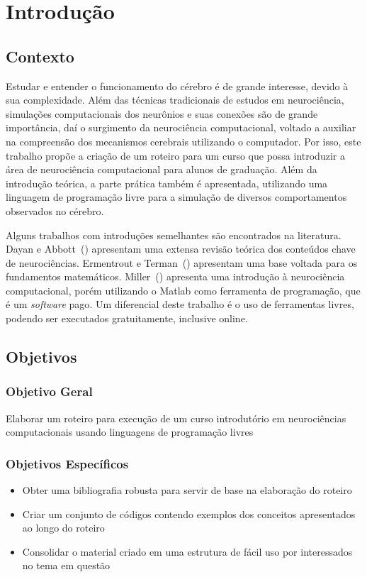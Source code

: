 \chapter{Introdução}\label{cap:introducao}
\section{Contexto}
Estudar e entender o funcionamento do cérebro é de grande interesse, devido à sua complexidade. Além das técnicas tradicionais de estudos em neurociência, simulações computacionais dos neurônios e suas conexões são de grande importância, daí o surgimento da neurociência computacional, voltado a auxiliar na compreensão dos mecanismos cerebrais utilizando o computador. Por isso, este trabalho propõe a criação de um roteiro para um curso que possa introduzir a área de neurociência computacional para alunos de graduação. Além da introdução teórica, a parte prática também é apresentada, utilizando uma linguagem de programação livre para a simulação de diversos comportamentos observados no cérebro.

Alguns trabalhos com introduções semelhantes são encontrados na literatura. Dayan e Abbott~(\citeyear{dayan_theoretical_2001}) apresentam uma extensa revisão teórica dos conteúdos chave de neurociências. Ermentrout e Terman~(\cite{ermentrout_mathematical_2010}) apresentam uma base voltada para os fundamentos matemáticos. Miller~(\cite{miller_introductory_2018}) apresenta uma introdução à neurociência computacional, porém utilizando o Matlab como ferramenta de programação, que é um \textit{software} pago. Um diferencial deste trabalho é o uso de ferramentas livres, podendo ser executados gratuitamente, inclusive online.

\section{Objetivos}
\subsection{Objetivo Geral}
Elaborar um roteiro para execução de um curso introdutório em neurociências computacionais usando linguagens de programação livres

\subsection{Objetivos Específicos}
\begin{itemize}
\item Obter uma bibliografia robusta para servir de base na elaboração do roteiro
\item Criar um conjunto de códigos contendo exemplos dos conceitos apresentados ao longo do roteiro
\item Consolidar o material criado em uma estrutura de fácil uso por interessados no tema em questão
\end{itemize}

